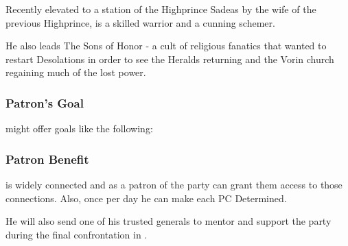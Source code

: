 Recently elevated to a station of the Highprince Sadeas by the wife of the previous Highprince, \npcAmaram{} is a skilled warrior and a cunning schemer. 

He also leads The Sons of Honor - a cult of religious fanatics that wanted to restart Desolations in order to see the Heralds returning and the Vorin church regaining much of the lost power.

\subsubsection{Patron's Goal}

\npcAmaram{} might offer goals like the following:


\subsubsection{Patron Benefit}

\npcAmaram{} is widely connected and as a patron of the party can grant them access to those connections. Also, once per day he can make each PC Determined.

He will also send one of his trusted generals to mentor and support the party during the final confrontation in .

